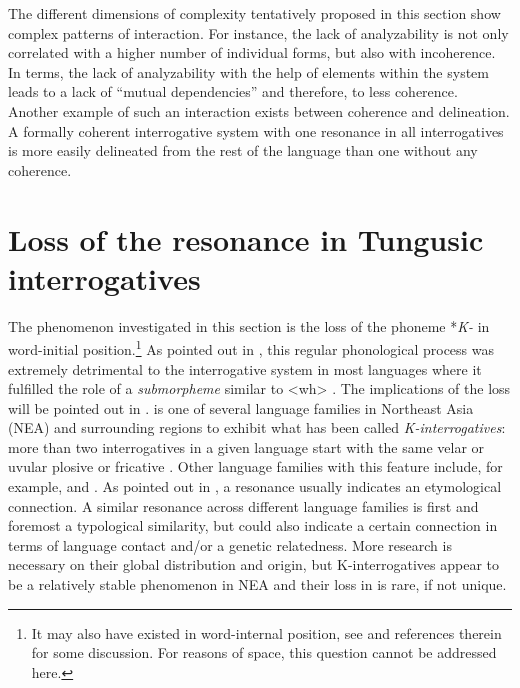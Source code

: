 \documentclass[output=paper,hidelinks]{langscibook}
\begin{document}
The different dimensions of complexity tentatively proposed in this section show complex patterns of interaction. For instance, the lack of analyzability is not only correlated with a higher number of individual forms, but also with incoherence. In  terms, the lack of analyzability with the help of elements within the system leads to a lack of ``mutual dependencies'' and therefore, to less coherence. Another example of such an interaction exists between coherence and delineation. A formally coherent interrogative system with one resonance in all interrogatives is more easily delineated from the rest of the language than one without any coherence.

\section{Loss of the resonance in Tungusic interrogatives}\label{sec3}

The phenomenon investigated in this section is the loss of the  phoneme *\textit{K-} in word-initial position.\footnote{It may also have existed in word-internal position, see \citet{Janhunen2017} and references therein for some discussion. For reasons of space, this question cannot be addressed here.} As pointed out in , this regular phonological process was extremely detrimental to the interrogative system in most languages where it fulfilled the role of a \textit{submorpheme} similar to  <wh> \citep{BickelNichols2007,Mackenzie2009}. The implications of the loss will be pointed out in .  is one of several language families in Northeast Asia (NEA) and surrounding regions to exhibit what has been called \textit{K-interrogatives}: more than two interrogatives in a given language start with the same velar or uvular plosive or fricative \citep[6, 405f., 432]{Hölzl2018b}. Other language families with this feature include, for example,  and . As pointed out in , a resonance usually indicates an etymological connection. A similar resonance across different language families is first and foremost a typological similarity, but could also indicate a certain connection in terms of language contact and/or a genetic relatedness. More research is necessary on their global distribution and origin, but K-interrogatives appear to be a relatively stable phenomenon in NEA and their loss in  is rare, if not unique.
\end{document}
